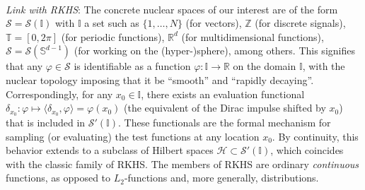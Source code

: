 \documentclass[11pt, english,english]{article}
\newcommand{\R}{ \mathbb{R}}
\newcommand{\Z}{ \mathbb{Z}}
\newcommand{\Lop}{{\rm L}}
\def\Spc#1{{\mathcal{#1}}}  %
\def\Op#1{{\mathrm{#1}}}  %
\newcommand{\embedC}{\xhookrightarrow{}}
\renewcommand{\[}{\begin{equation}}
\renewcommand{\]}[1]{\label{eq:#1}\end{equation}}
\begin{document}
\\[1ex]
%
{\em Link with RKHS}: The concrete nuclear spaces of our interest are of the form $\Spc S=\Spc S(\mathbb{I})$ with $\mathbb{I}$ a set such as $\{1,\dots,N\}$ (for vectors), $\Z$ (for discrete signals), $\mathbb{T}=[0,2\pi]$ (for periodic functions), $\R^d$ (for multidimensional functions), $\Spc S=\Spc S(\mathbb{S}^{d-1})$ (for working on the (hyper-)sphere), among others. This signifies that any $\varphi \in \Spc S$ is identifiable as a function $\varphi: \mathbb{I}\to \R$ on the domain $\mathbb{I}$, with the nuclear topology imposing that it be ``smooth'' and ``rapidly decaying''. Correspondingly, for any $x_0 \in \mathbb{I}$, there exists an evaluation functional $\delta_{x_0}: \varphi \mapsto \langle \delta_{x_0},\varphi\rangle=\varphi(x_0)$ (the equivalent of the Dirac impulse shifted by $x_0$) that is included in $\Spc S'(\mathbb{I})$. These functionals are the formal mechanism for sampling (or evaluating) the test functions at any location $x_0$. By continuity, this behavior extends to a subclass of Hilbert spaces $\Spc H \subset \Spc S'(\mathbb{I})$, which coincides with the classic family of RKHS. The members of RKHS are ordinary {\em continuous} functions, as opposed to $L_2$-functions and, more generally, distributions.

%
\end{document}
